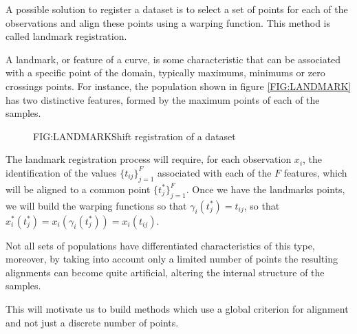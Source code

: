 A possible solution to register a dataset is to select a set of points for each
of the observations and align these points using a warping function. This method
 is called landmark registration.

A landmark, or feature of a curve, is some characteristic that can be
associated with a specific point of the domain, typically maximums, minimums or
zero crossings points. For instance, the population shown in figure
\ref{FIG:LANDMARK} has two distinctive features, formed by the maximum points of
 each of the samples.


\begin{figure}[Shift registration of a dataset]{FIG:LANDMARK}{Shift registration of a dataset}
   \quad
\end{figure}


The landmark registration process will require, for each observation $x_i$,
the identification of the values $\{t_{ij}\}_{j=1}^{F}$ associated with each of
the $F$ features, which will be aligned to a common point
$\{t_{j}^*\}_{j=1}^{F}$. Once we have the landmarks points, we will build the
 warping functions so that $\gamma_i(t_j^*)=t_{ij}$, so that
$x_i^*(t_j^*) = x_i(\gamma_i(t_j^*)) = x_i(t_{ij})$.

Not all sets of populations have differentiated characteristics of this type,
moreover, by taking into account only a limited number of points the resulting
alignments can become quite artificial, altering the internal structure of the
samples.

This will motivate us to build methods which use a global criterion for
alignment and not just a discrete number of points.

